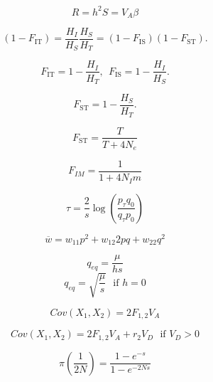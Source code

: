 \documentclass[12pt,twocolumn]{article}
\newcommand{\fis}{F_{\mathrm{IS}}}
\newcommand{\fit}{F_{\mathrm{IT}}}
\newcommand{\fst}{F_{\mathrm{ST}}}
\begin{document}
\begin{equation}
R = h^2 S = V_A \beta \nonumber
\end{equation}


\begin{equation}
(1-\fit) =\frac{H_I}{H_S} \frac{H_S}{H_T}=(1-\fis)(1-\fst).\nonumber
\label{eqn:F_relationships}
\end{equation}

\begin{equation}
\fit =1-\frac{H_I}{H_T},~~\fis =1-\frac{H_I}{H_S}.\nonumber
\end{equation}

\begin{equation}
\fst =1-\frac{H_S}{H_T}.\nonumber
\end{equation}

\begin{equation}
  \fst = \frac{ T}{ T + 4N_e } \nonumber
\end{equation}

\begin{equation}
  F_{IM} = \frac{1}{1 + 4N_I m} \nonumber
\end{equation}


\begin{equation}
	\tau = \frac{2}{s} \log \left(\frac{p_{\tau} q_0}{q_{\tau}
            p_0}\right) \nonumber
\end{equation}

\begin{equation}
\overline{w} = w_{11}p^2+w_{12}2pq+w_{22}q^2  \nonumber
\end{equation}

\begin{equation}
q_{eq} = \frac{\mu}{hs}  \nonumber
\end{equation}
\begin{equation}
q_{eq} =\sqrt{\frac{\mu}{s}}~~~\textrm{if } h=0 \nonumber
\end{equation}

\begin{equation}
Cov(X_1,X_2)  = 2 F_{1,2} V_A  \nonumber
\end{equation}

\begin{equation}
Cov(X_1,X_2)  = 2F_{1,2} V_A + r_2 V_D~~~\textrm{if } V_D>0  \nonumber
\end{equation}

\begin{equation}
\pi \left(\frac{1}{2N} \right) = \frac{1-e^{-s }}{1-e^{-2Ns}}  \nonumber
\end{equation}
\end{document}
